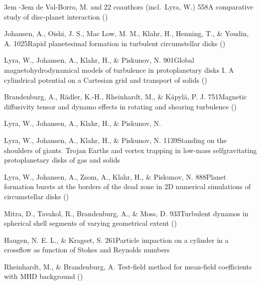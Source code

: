 \documentclass[\mydriver,12pt,twoside,notitlepage,a4paper]{article}
\begin{document}
\begin{list}{}{\leftmargin 3em \itemindent -3em\listparindent \itemindent
\itemsep 0pt \parsep 1pt}
de Val-Borro, M. and 22 coauthors (incl.\ Lyra, W.)
{558}{A comparative study of disc-planet interaction}
()

Johansen, A., Oishi, J. S., Mac Low, M. M., Klahr, H., Henning, T.,
\& Youdin, A.
{1025}{Rapid planetesimal formation in turbulent circumstellar disks}
()

Lyra, W., Johansen, A., Klahr, H., \& Piskunov, N.
{901}{Global magnetohydrodynamical models of turbulence in protoplanetary disks I. A cylindrical potential on a Cartesian grid and transport of solids}
()

Brandenburg, A., R\"adler, K.-H., Rheinhardt, M., \& K\"apyl\"a, P. J.
{751}{Magnetic diffusivity tensor and dynamo effects in rotating
and shearing turbulence}
()

Lyra, W., Johansen, A., Klahr, H., \& Piskunov, N.

Lyra, W., Johansen, A., Klahr, H., \& Piskunov, N.
{1139}{Standing on the shoulders of giants. Trojan Earths and vortex trapping in low-mass selfgravitating protoplanetary disks of gas and solids}

Lyra, W., Johansen, A., Zsom, A., Klahr, H., \& Piskunov, N.
{888}{Planet formation bursts at the borders of the dead zone in 2D numerical simulations of circumstellar disks}
()

Mitra, D., Tavakol, R., Brandenburg, A., \& Moss, D.
{933}{Turbulent dynamos in spherical shell segments of varying geometrical extent} ()

Haugen, N. E. L., \& Kragset, S.
{261}{Particle impaction on a cylinder in a crossflow as function of Stokes and Reynolds numbers}

Rheinhardt, M., \& Brandenburg, A.
{Test-field method for mean-field coefficients with MHD background}
()

\end{list}
\clearpage
\end{document}
